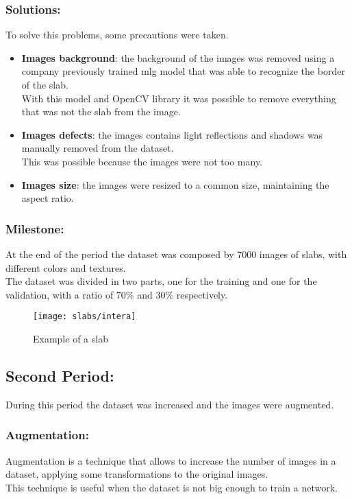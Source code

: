 \subsubsection{Solutions:}
To solve this problems, some precautions were taken.\\
\begin{itemize}
    \item \textbf{Images background}: the background of the images was removed using a company previously trained \gls{mlg} model that was able to recognize the border of the slab.\\
                              With this model and OpenCV library it was possible to remove everything that was not the slab from the image.
    \item \textbf{Images defects}: the images contains light reflections and shadows was manually removed from the dataset.\\
                                   This was possible because the images were not too many.
    \item \textbf{Images size}: the images were resized to a common size, maintaining the aspect ratio.\\
\end{itemize}
\subsubsection{Milestone:}
At the end of the period the dataset was composed by 7000 images of slabs, with different colors and textures.\\
The dataset was divided in two parts, one for the training and one for the validation, with a ratio of 70\% and 30\% respectively.\\
\begin{figure}
    \centering
    \texttt{[image: slabs/intera]}
    \caption{Example of a slab}
\end{figure}
\subsection{Second Period:}
During this period the dataset was increased and the images were augmented.\\
\subsubsection{Augmentation:}
Augmentation is a technique that allows to increase the number of images in a dataset, applying some transformations to the original images.\\
This technique is useful when the dataset is not big enough to train a network.\\


